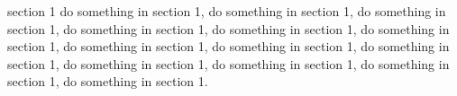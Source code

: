 section 1
do something in section 1,
do something in section 1,
do something in section 1,
do something in section 1,
do something in section 1,
do something in section 1,
do something in section 1,
do something in section 1,
do something in section 1,
do something in section 1,
do something in section 1,
do something in section 1,
do something in section 1.
